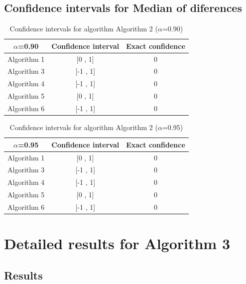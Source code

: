 \documentclass[a4paper,10pt]{article}
\begin{document}
\subsection{Confidence intervals for Median of diferences}

\begin{table}[!htp]
\centering\small
\begin{tabular}{
|c|c|c|}
\hline
 $\alpha$=0.90 & Confidence interval & Exact confidence \\ \hline 
Algorithm 1 & [0 , 1] & 0\\ \hline 
Algorithm 3 & [-1 , 1] & 0\\ \hline 
Algorithm 4 & [-1 , 1] & 0\\ \hline 
Algorithm 5 & [0 , 1] & 0\\ \hline 
Algorithm 6 & [-1 , 1] & 0\\ \hline 

\end{tabular}
\caption{Confidence intervals for algorithm Algorithm 2 ($\alpha$=0.90)}
\end{table}
\begin{table}[!htp]
\centering\small
\begin{tabular}{
|c|c|c|}
\hline
 $\alpha$=0.95 & Confidence interval & Exact confidence \\ \hline 
Algorithm 1 & [0 , 1] & 0\\ \hline 
Algorithm 3 & [-1 , 1] & 0\\ \hline 
Algorithm 4 & [-1 , 1] & 0\\ \hline 
Algorithm 5 & [0 , 1] & 0\\ \hline 
Algorithm 6 & [-1 , 1] & 0\\ \hline 

\end{tabular}
\caption{Confidence intervals for algorithm Algorithm 2 ($\alpha$=0.95)}
\end{table}

 \clearpage 


\section{Detailed results for Algorithm 3}


\subsection{Results}
\end{document}
